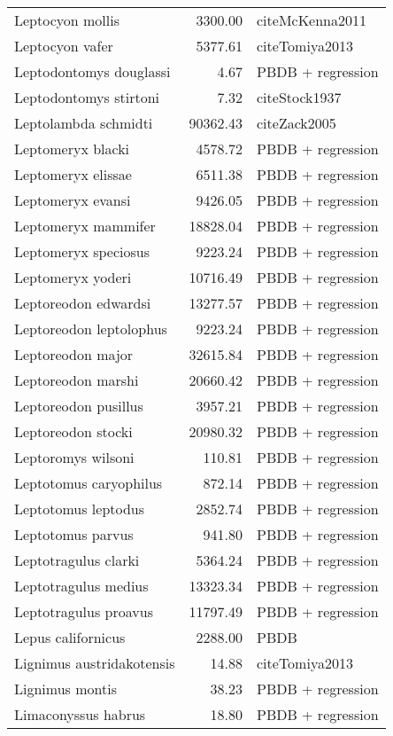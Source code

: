 \begin{table}[ht]
\begin{tabular}{lrl}
  Leptocyon mollis & 3300.00 & cite{McKenna2011} \\ 
  Leptocyon vafer & 5377.61 & cite{Tomiya2013} \\ 
  Leptodontomys douglassi & 4.67 & PBDB + regression \\ 
  Leptodontomys stirtoni & 7.32 & cite{Stock1937} \\ 
  Leptolambda schmidti & 90362.43 & cite{Zack2005} \\ 
  Leptomeryx blacki & 4578.72 & PBDB + regression \\ 
  Leptomeryx elissae & 6511.38 & PBDB + regression \\ 
  Leptomeryx evansi & 9426.05 & PBDB + regression \\ 
  Leptomeryx mammifer & 18828.04 & PBDB + regression \\ 
  Leptomeryx speciosus & 9223.24 & PBDB + regression \\ 
  Leptomeryx yoderi & 10716.49 & PBDB + regression \\ 
  Leptoreodon edwardsi & 13277.57 & PBDB + regression \\ 
  Leptoreodon leptolophus & 9223.24 & PBDB + regression \\ 
  Leptoreodon major & 32615.84 & PBDB + regression \\ 
  Leptoreodon marshi & 20660.42 & PBDB + regression \\ 
  Leptoreodon pusillus & 3957.21 & PBDB + regression \\ 
  Leptoreodon stocki & 20980.32 & PBDB + regression \\ 
  Leptoromys wilsoni & 110.81 & PBDB + regression \\ 
  Leptotomus caryophilus & 872.14 & PBDB + regression \\ 
  Leptotomus leptodus & 2852.74 & PBDB + regression \\ 
  Leptotomus parvus & 941.80 & PBDB + regression \\ 
  Leptotragulus clarki & 5364.24 & PBDB + regression \\ 
  Leptotragulus medius & 13323.34 & PBDB + regression \\ 
  Leptotragulus proavus & 11797.49 & PBDB + regression \\ 
  Lepus californicus & 2288.00 & PBDB \\ 
  Lignimus austridakotensis & 14.88 & cite{Tomiya2013} \\ 
  Lignimus montis & 38.23 & PBDB + regression \\ 
  Limaconyssus habrus & 18.80 & PBDB + regression \\ 

\end{tabular}
\end{table}
